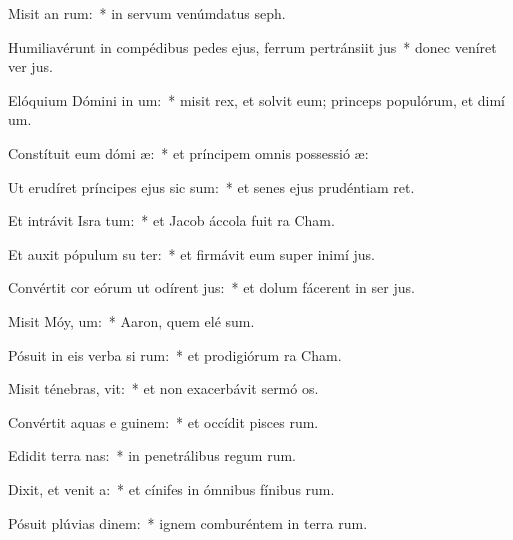 \item Misit an  rum:~* in servum venúmdatus  seph.
\item Humiliavérunt in compédibus pedes ejus, ferrum pertránsiit  jus~* donec veníret ver jus.
\item Elóquium Dómini in um:~* misit rex, et solvit eum; princeps populórum, et dimí um.
\item Constítuit eum dómi  æ:~* et príncipem omnis possessió æ:
\item Ut erudíret príncipes ejus sic sum:~* et senes ejus prudéntiam ret.
\item Et intrávit Isra  tum:~* et Jacob áccola fuit  ra Cham.
\item Et auxit pópulum su ter:~* et firmávit eum super inimí jus.
\item Convértit cor eórum ut odírent  jus:~* et dolum fácerent in ser jus.
\item Misit Móy,  um:~* Aaron, quem elé sum.
\item Pósuit in eis verba si rum:~* et prodigiórum  ra Cham.
\item Misit ténebras,  vit:~* et non exacerbávit sermó os.
\item Convértit aquas e  guinem:~* et occídit pisces rum.
\item Edidit terra  nas:~* in penetrálibus regum rum.
\item Dixit, et venit a:~* et cínifes in ómnibus fínibus rum.
\item Pósuit plúvias  dinem:~* ignem comburéntem in terra rum.
